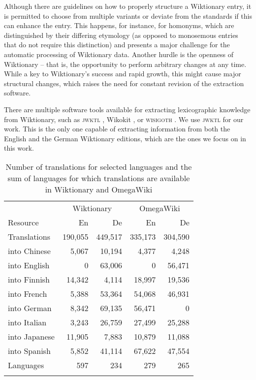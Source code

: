 \documentclass[output=paper]{LSP/langsci}
\begin{document}
Although there are guidelines on how to properly structure a Wiktionary entry, it is permitted to choose from multiple variants or deviate from the standards if this can enhance the entry. This happens, for instance, for homonyms, which are distinguished by their differing etymology (as opposed to monosemous entries that do not require this distinction) and presents a major challenge for the automatic processing of Wiktionary data. Another hurdle is the openness of Wiktionary -- that is, the opportunity to perform arbitrary changes at any time. While a key to Wiktionary's success and rapid growth, this might cause major structural changes, which raises the need for constant revision of the extraction software.

There are multiple software tools available for extracting lexicographic knowledge from Wiktionary, such as \textsc{jwktl} \citep{Zesch2008}, Wikokit \citep{Krizhanovsky09}, or \textsc{wisigoth} \citep{Navarro2009}. We use \textsc{jwktl} for our work. This is the only one capable of extracting information from both the English and the German Wiktionary editions, which are the ones we focus on in this work.


\begin{table} 
  \begin{tabularx}{\textwidth}{Xrrrr}
    \lsptoprule
		      & \multicolumn{2}{c}{Wiktionary} &\multicolumn{2}{c}{OmegaWiki}\\\cmidrule(lr){2-3}\cmidrule(lr){4-5}
    Resource          &   En &    De &   En &   De \\
    \midrule
    Translations  & 190,055 & 449,517 &  335,173	& 304,590\\
    into Chinese &   5,067 &  10,194 &   4,377  & 4,248 \\
    into English &       0 &  63,006 & 0 & 56,471  \\
    into Finnish &  14,342 &   4,114 &   18,997 & 19,536   \\
    into French &   5,388 &  53,364 &  54,068  & 46,931\\
    into German &   8,342 &  69,135 &   56,471  & 0 \\
    into Italian &   3,243 &  26,759 & 27,499& 25,288  \\
    into Japanese &  11,905 &   7,883 & 10,879 &  11,088  \\
    into Spanish &   5,852 &  41,114 &  67,622 & 47,554  \\
    \midrule
    Languages                    &     597 &     234 &    279  &  265\\ 
    \lspbottomrule
  \end{tabularx}
  \caption{Number of translations for selected languages and the sum of languages for which translations are available in Wiktionary and OmegaWiki}
  \label{tab:lang:trans}
\end{table}
\end{document}
